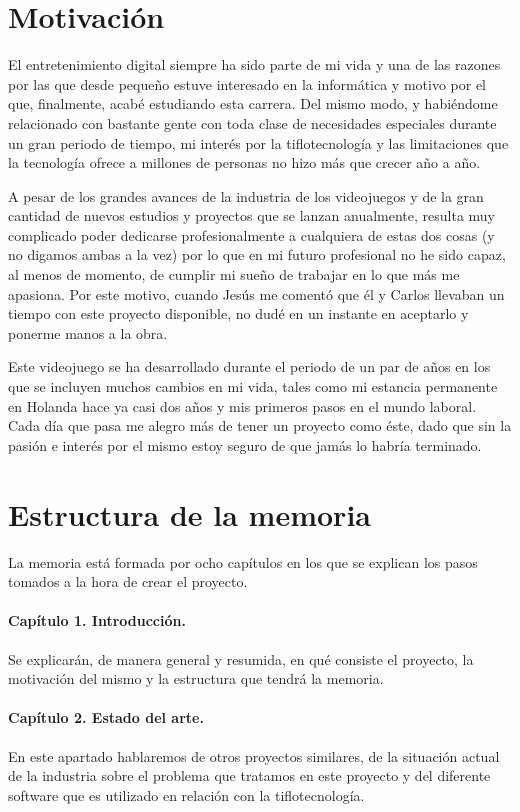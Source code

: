 \section{Motivación}
El entretenimiento digital siempre ha sido parte de mi vida y una de las razones por las que desde pequeño estuve interesado en la informática y motivo por el que, finalmente, acabé estudiando esta carrera. Del mismo modo, y habiéndome relacionado con bastante gente con toda clase de necesidades especiales durante un gran periodo de tiempo, mi interés por la tiflotecnología y las limitaciones que la tecnología ofrece a millones de personas no hizo más que crecer año a año.

A pesar de los grandes avances de la industria de los videojuegos y de la gran cantidad de nuevos estudios y proyectos que se lanzan anualmente, resulta muy complicado poder dedicarse profesionalmente a cualquiera de estas dos cosas (y no digamos ambas a la vez) por lo que en mi futuro profesional no he sido capaz, al menos de momento, de cumplir mi sueño de trabajar en lo que más me apasiona. Por este motivo, cuando Jesús me comentó que él y Carlos llevaban un tiempo con este proyecto disponible, no dudé en un instante en aceptarlo y ponerme manos a la obra.

Este videojuego se ha desarrollado durante el periodo de un par de años en los que se incluyen muchos cambios en mi vida, tales como mi estancia permanente en Holanda hace ya casi dos años y mis primeros pasos en el mundo laboral. Cada día que pasa me alegro más de tener un proyecto como éste, dado que sin la pasión e interés por el mismo estoy seguro de que jamás lo habría terminado.

\section{Estructura de la memoria}

La memoria está formada por ocho capítulos en los que se explican los pasos tomados a la hora de crear el proyecto.

\paragraph*{Capítulo 1. Introducción.}
Se explicarán, de manera general y resumida, en qué consiste el proyecto, la motivación del mismo y la estructura que tendrá la memoria.

\paragraph*{Capítulo 2. Estado del arte.}
En este apartado hablaremos de otros proyectos similares, de la situación actual de la industria sobre el problema que tratamos en este proyecto y del diferente software que es utilizado en relación con la tiflotecnología.

